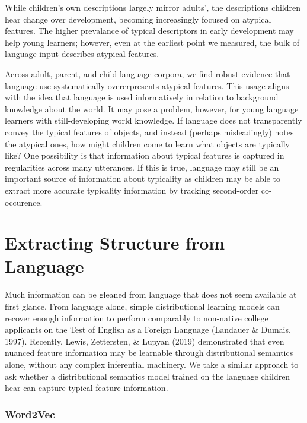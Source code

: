 \documentclass[10pt, letterpaper]{article}
\begin{document}
While children's own descriptions largely mirror adults', the
descriptions children hear change over development, becoming
increasingly focused on atypical features. The higher prevalance of
typical descriptors in early development may help young learners;
however, even at the earliest point we measured, the bulk of language
input describes atypical features.

Across adult, parent, and child language corpora, we find robust
evidence that language use systematically overerpresents atypical
features. This usage aligns with the idea that language is used
informatively in relation to background knowledge about the world. It
may pose a problem, however, for young language learners with
still-developing world knowledge. If language does not transparently
convey the typical features of objects, and instead (perhaps
misleadingly) notes the atypical ones, how might children come to learn
what objects are typically like? One possibility is that information
about typical features is captured in regularities across many
utterances. If this is true, language may still be an important source
of information about typicality as children may be able to extract more
accurate typicality information by tracking second-order co-occurence.

\hypertarget{extracting-structure-from-language}{%
\section{Extracting Structure from
Language}\label{extracting-structure-from-language}}

Much information can be gleaned from language that does not seem
available at first glance. From language alone, simple distributional
learning models can recover enough information to perform comparably to
non-native college applicants on the Test of English as a Foreign
Language (Landauer \& Dumais, 1997). Recently, Lewis, Zettersten, \&
Lupyan (2019) demonstrated that even nuanced feature information may be
learnable through distributional semantics alone, without any complex
inferential machinery. We take a similar approach to ask whether a
distributional semantics model trained on the language children hear can
capture typical feature information.

\hypertarget{word2vec}{%
\subsubsection{Word2Vec}\label{word2vec}}
\end{document}

